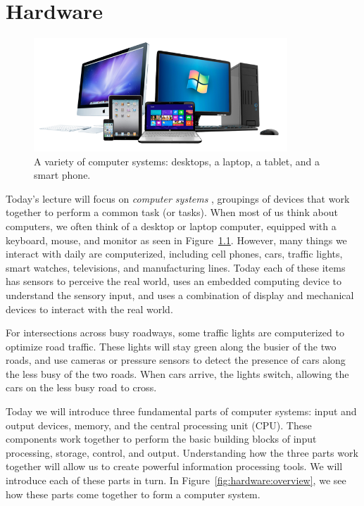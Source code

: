 \chapter{Hardware}

\begin{figure}
	\centering
	\includegraphics[width=0.85\textwidth]{images/computer_system.png}
	\caption{A variety of computer systems: desktops, a laptop, a tablet, and a
    smart phone. }
	\label{fig:hardware:computers}
\end{figure}

Today's lecture will focus on \emph{computer systems} , groupings of devices that work together to perform a common
task (or tasks).  When most of us think about
computers, we often think of a desktop or laptop computer, equipped with a
keyboard, mouse, and monitor as seen in Figure~\ref{fig:hardware:computers}.
However, many things we interact with daily are computerized, including cell
phones, cars, traffic lights, smart watches, televisions, and manufacturing
lines. Today each of these items has sensors to perceive the real world, uses an
embedded computing device to understand the sensory input, and uses a combination
of display and mechanical devices to interact with the real world.

\begin{example}
  For intersections across busy roadways, some traffic lights are computerized
  to optimize road traffic. These lights will stay green along the busier of the
  two roads, and use cameras or pressure sensors to detect the presence of cars
  along the less busy of the two roads. When cars arrive, the lights switch,
  allowing the cars on the less busy road to cross.
\end{example}

Today we will introduce three fundamental parts of computer systems:
input and output devices, memory, and the central processing unit (CPU).
These components work together to perform the basic building blocks of
input processing, storage, control, and output. Understanding how the
three parts work together will allow us to create powerful information
processing tools. We will introduce each of these parts in turn.
In Figure~\ref{fig:hardware:overview}, we see how these parts come
together to form a computer system.

